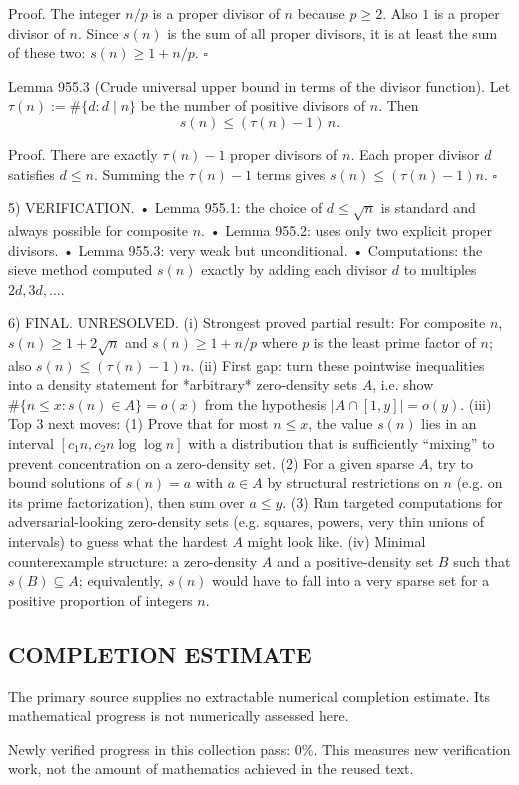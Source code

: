 Proof.
The integer $n/p$ is a proper divisor of $n$ because $p\ge 2$.
Also $1$ is a proper divisor of $n$.
Since $s(n)$ is the sum of all proper divisors, it is at least the sum of these two:
$s(n)\ge 1+n/p$.
\hfill $\square$

Lemma 955.3 (Crude universal upper bound in terms of the divisor function).
Let $\tau(n):=\#\{d:d\mid n\}$ be the number of positive divisors of $n$.
Then
\[
 s(n)\le (\tau(n)-1)\,n.
\]

Proof.
There are exactly $\tau(n)-1$ proper divisors of $n$.
Each proper divisor $d$ satisfies $d\le n$.
Summing the $\tau(n)-1$ terms gives $s(n)\le (\tau(n)-1)n$.
\hfill $\square$

5) VERIFICATION.
• Lemma 955.1: the choice of $d\le \sqrt{n}$ is standard and always possible for composite $n$.
• Lemma 955.2: uses only two explicit proper divisors.
• Lemma 955.3: very weak but unconditional.
• Computations: the sieve method computed $s(n)$ exactly by adding each divisor $d$ to multiples $2d,3d,\dots$.

6) FINAL.
UNRESOLVED.
(i) Strongest proved partial result: For composite $n$, $s(n)\ge 1+2\sqrt{n}$ and $s(n)\ge 1+n/p$ where $p$ is the least prime factor of $n$; also $s(n)\le (\tau(n)-1)n$.
(ii) First gap: turn these pointwise inequalities into a density statement for *arbitrary* zero-density sets $A$, i.e. show $\#\{n\le x: s(n)\in A\}=o(x)$ from the hypothesis $|A\cap[1,y]|=o(y)$.
(iii) Top 3 next moves:
  (1) Prove that for most $n\le x$, the value $s(n)$ lies in an interval $[c_1 n, c_2 n\log\log n]$ with a distribution that is sufficiently “mixing” to prevent concentration on a zero-density set.
  (2) For a given sparse $A$, try to bound solutions of $s(n)=a$ with $a\in A$ by structural restrictions on $n$ (e.g. on its prime factorization), then sum over $a\le y$.
  (3) Run targeted computations for adversarial-looking zero-density sets (e.g. squares, powers, very thin unions of intervals) to guess what the hardest $A$ might look like.
(iv) Minimal counterexample structure: a zero-density $A$ and a positive-density set $B$ such that $s(B)\subseteq A$; equivalently, $s(n)$ would have to fall into a very sparse set for a positive proportion of integers $n$.




\subsection*{COMPLETION ESTIMATE}
The primary source supplies no extractable numerical completion estimate. Its mathematical progress is not numerically assessed here.

Newly verified progress in this collection pass: $0\%$. This measures new verification work, not the amount of mathematics achieved in the reused text.
